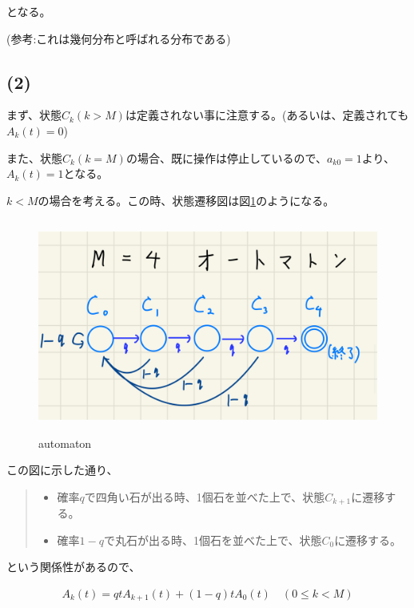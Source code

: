 \documentclass[a4paper, 10pt, dvipdfmx]{jlreq}
\begin{document}
となる。

(参考:これは幾何分布と呼ばれる分布である\cite{site:geo})

\subsection*{(2)}

まず、状態$C_k(k>M)$は定義されない事に注意する。(あるいは、定義されても$A_k(t)=0$)

また、状態$C_k(k=M)$の場合、既に操作は停止しているので、$a_{k0}=1$より、$A_k(t)=1$となる。

$k<M$の場合を考える。この時、状態遷移図は図\ref{img:automaton}のようになる。

\begin{figure}[htbp]
    \begin{center}
        \includegraphics[height=70mm]{automaton.png}
        \caption{automaton}
        \label{img:automaton}
    \end{center}
\end{figure}

この図に示した通り、

\begin{quote}
    \begin{itemize}
        \item 確率$q$で四角い石が出る時、1個石を並べた上で、状態$C_{k+1}$に遷移する。
        \item 確率$1-q$で丸石が出る時、1個石を並べた上で、状態$C_0$に遷移する。
    \end{itemize}
\end{quote}

という関係性があるので、

\begin{align*}
    A_k(t)=qtA_{k+1}(t)+(1-q)tA_0(t) \quad (0 \leq k < M)
\end{align*}
\end{document}
